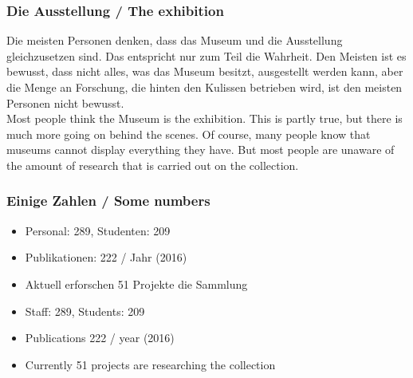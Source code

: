 \documentclass[12pt]{beamer}
\begin{document}
{\scriptsize
\begin{frame}
  \frametitle{Die Ausstellung / \textcolor{mfn_green}{The exhibition}}
Die meisten Personen denken, dass das Museum und die Ausstellung gleichzusetzen sind. Das entspricht nur zum Teil die Wahrheit. Den Meisten ist es bewusst, dass nicht alles, was das Museum besitzt, ausgestellt werden kann, aber die Menge an Forschung, die hinten den Kulissen betrieben wird, ist den meisten Personen nicht bewusst.\\
  \bigskip
  \textcolor{mfn_green}{Most people think the Museum is the exhibition. This is partly true, but there is much more going on behind the scenes. Of course, many people know that museums cannot display everything they have. But most people are unaware of the amount of research that is carried out on the collection.}
\end{frame}
}
\begin{frame}
  \frametitle{ Einige Zahlen / \textcolor{mfn_green}{Some numbers}}

  \begin{itemize}
  \item{Personal: 289, Studenten: 209}
  \item{Publikationen: 222 / Jahr (2016)}
  \item{Aktuell erforschen 51 Projekte die Sammlung}
  \end{itemize}
  
  \begin{itemize}
  \item{\textcolor{mfn_green}{Staff: 289, Students: 209}}
  \item{\textcolor{mfn_green}{Publications 222 / year (2016)}}
  \item{\textcolor{mfn_green}{Currently 51 projects are researching the collection}}
  \end{itemize}
  \bigskip
  \begin{center}\end{center}
\end{frame}
\end{document}
